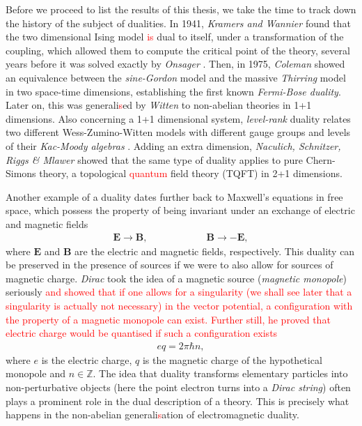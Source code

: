 Before we proceed to list the results of this thesis, we take the time to track down the history of the subject of dualities. In 1941, \textit{Kramers and Wannier} \cite{PhysRev.60.252} found that the two dimensional Ising model \textcolor{red}{is} dual to itself, under a transformation of the coupling, which allowed them to compute the critical point of the theory, several years before it was solved exactly by \textit{Onsager} \cite{PhysRev.65.117}.  Then, in 1975, \colorbox{red}{ } \textit{Coleman} \cite{Coleman:1974bu} showed an equivalence between the \textit{sine-Gordon} model \cite{Scott1973} and the massive \textit{Thirring} model \cite{Thirring1958} in two space-time dimensions, establishing the first known \textit{Fermi-Bose duality}. Later on, this was generali\textcolor{red}{s}ed by \textit{Witten} \cite{Witten:1983ar} to non-abelian theories in 1+1 dimensions. Also concerning a 1+1 dimensional system, \textit{level-rank} duality relates two different Wess-Zumino-Witten models with different gauge groups and levels of their \textit{Kac-Moody algebras} \cite{Nakanishi:1990hj, Naculich:1990hg}. Adding an extra dimension, \textit{Naculich, Schnitzer, Riggs \& Mlawer} \cite{Mlawer:1990uv, Naculich:2007nc} showed that the same type of duality applies to pure Chern-Simons theory, a topological \textcolor{red}{quantum} field theory (TQFT) in 2+1 dimensions. 

Another example of a duality dates further back to Maxwell's equations in free space, which possess the property of being invariant under an exchange of electric and magnetic fields
\begin{align}
\bm{E}\rightarrow \bm{B}, \qquad\qquad\qquad \bm{B}\rightarrow -\bm{E},
\end{align}
where $\bm{E}$ and $\bm{B}$ are the electric and magnetic fields, respectively. This duality can be preserved in the presence of sources if we were to also allow for sources of magnetic charge. \textit{Dirac} \cite{Dirac:1931kp} took the idea of a magnetic source (\textit{magnetic monopole}) seriously \textcolor{red}{and showed that if one allows for a singularity (we shall see later that a singularity is actually not necessary) in the vector potential, a configuration with the property of a magnetic monopole can exist. Further still, he proved that electric charge would be quanti\textcolor{red}{s}ed if such a configuration exists}
\begin{align}
eq = 2\pi \hbar n,
\end{align}
where $e$ is the electric charge, $q$ is the magnetic charge of the hypothetical monopole and $n \in \mathbb{Z}$. The idea that duality transforms elementary particles into non-perturbative objects (here the point electron turns into a \textit{Dirac string}) often plays a prominent role in the dual description of a theory. This is precisely what happens in the non-abelian generali\textcolor{red}{s}ation of electromagnetic duality.


